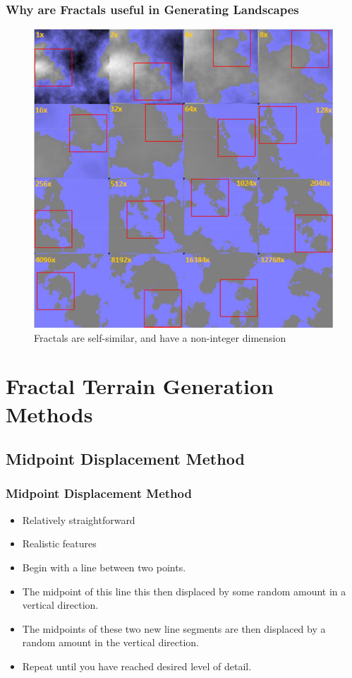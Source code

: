 \documentclass{beamer}
\begin{document}
\begin{frame}
\frametitle{Why are Fractals useful in Generating Landscapes}
\begin{center}
\begin{figure}[h]
\includegraphics[scale=0.13]{SelfSimilarity.jpg}
\caption{Fractals are self-similar, and have a non-integer dimension}
\label{fig:selfsimilar}
\end{figure}
\end{center}
\end{frame}


\section{Fractal Terrain Generation Methods}
\subsection{Midpoint Displacement Method}

\begin{frame}
  \frametitle{Midpoint Displacement Method}
\begin{itemize}
 \item Relatively straightforward
 \item Realistic features
\item Begin with a line between two points.
\item The midpoint of this line this then displaced by some random amount in a vertical direction.
\item The midpoints of these two new line segments are then displaced by a random amount in the vertical direction.
\item Repeat until you have reached desired level of detail.
\end{itemize}
\end{frame}
\end{document}
